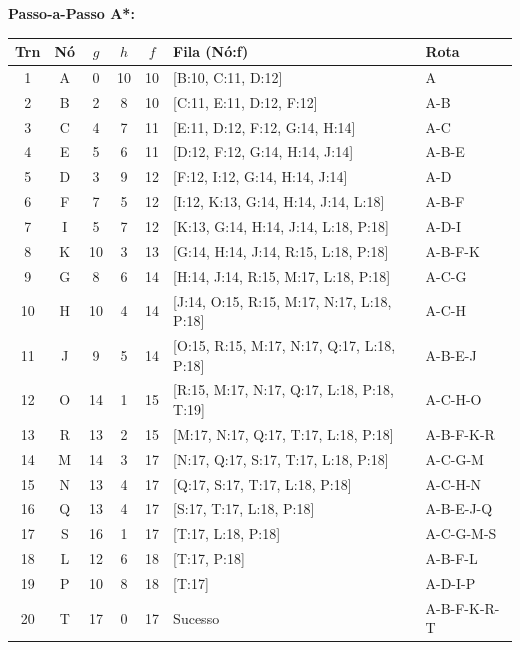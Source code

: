 \textbf{Passo-a-Passo A*:}
\begin{table}[h!]
\centering
\scriptsize
\begin{tabular}{|c|c|c|c|c|l|l|}
\hline
\textbf{Trn} & \textbf{Nó} & \textbf{$g$} & \textbf{$h$} & \textbf{$f$} & \textbf{Fila (Nó:f)} & \textbf{Rota} \\ \hline
1 & A & 0 & 10 & 10 & [B:10, C:11, D:12] & A \\ \hline
2 & B & 2 & 8 & 10 & [C:11, E:11, D:12, F:12] & A-B \\ \hline
3 & C & 4 & 7 & 11 & [E:11, D:12, F:12, G:14, H:14] & A-C \\ \hline
4 & E & 5 & 6 & 11 & [D:12, F:12, G:14, H:14, J:14] & A-B-E \\ \hline
5 & D & 3 & 9 & 12 & [F:12, I:12, G:14, H:14, J:14] & A-D \\ \hline
6 & F & 7 & 5 & 12 & [I:12, K:13, G:14, H:14, J:14, L:18] & A-B-F \\ \hline
7 & I & 5 & 7 & 12 & [K:13, G:14, H:14, J:14, L:18, P:18] & A-D-I \\ \hline
8 & K & 10 & 3 & 13 & [G:14, H:14, J:14, R:15, L:18, P:18] & A-B-F-K \\ \hline
9 & G & 8 & 6 & 14 & [H:14, J:14, R:15, M:17, L:18, P:18] & A-C-G \\ \hline
10 & H & 10 & 4 & 14 & [J:14, O:15, R:15, M:17, N:17, L:18, P:18] & A-C-H \\ \hline
11 & J & 9 & 5 & 14 & [O:15, R:15, M:17, N:17, Q:17, L:18, P:18] & A-B-E-J \\ \hline
12 & O & 14 & 1 & 15 & [R:15, M:17, N:17, Q:17, L:18, P:18, T:19] & A-C-H-O \\ \hline
13 & R & 13 & 2 & 15 & [M:17, N:17, Q:17, T:17, L:18, P:18] & A-B-F-K-R \\ \hline
14 & M & 14 & 3 & 17 & [N:17, Q:17, S:17, T:17, L:18, P:18] & A-C-G-M \\ \hline
15 & N & 13 & 4 & 17 & [Q:17, S:17, T:17, L:18, P:18] & A-C-H-N \\ \hline
16 & Q & 13 & 4 & 17 & [S:17, T:17, L:18, P:18] & A-B-E-J-Q \\ \hline
17 & S & 16 & 1 & 17 & [T:17, L:18, P:18] & A-C-G-M-S \\ \hline
18 & L & 12 & 6 & 18 & [T:17, P:18] & A-B-F-L \\ \hline
19 & P & 10 & 8 & 18 & [T:17] & A-D-I-P \\ \hline
20 & T & 17 & 0 & 17 & Sucesso & A-B-F-K-R-T \\ \hline
\end{tabular}
\end{table}

